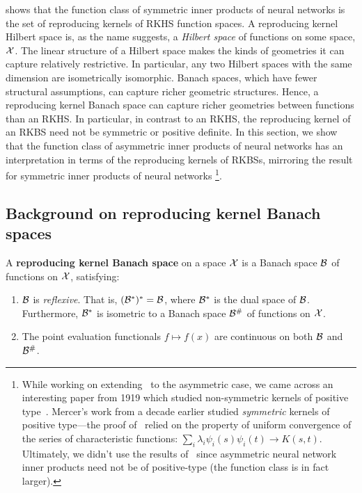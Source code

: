  shows that the function class of symmetric inner products of neural networks is the set of reproducing kernels of RKHS function spaces. A reproducing kernel Hilbert space is, as the name suggests, a \textit{Hilbert space} of functions on some space, ${\mathcal{X}}$. The linear structure of a Hilbert space makes the kinds of geometries it can capture relatively restrictive. In particular, any two Hilbert spaces with the same dimension are isometrically isomorphic. Banach spaces, which have fewer structural assumptions, can capture richer geometric structures. Hence, a reproducing kernel Banach space can capture richer geometries between functions than an RKHS. In particular, in contrast to an RKHS, the reproducing kernel of an RKBS need not be symmetric or positive definite. In this section, we show that the function class of asymmetric inner products of neural networks has an interpretation in terms of the reproducing kernels of RKBSs, mirroring the result for symmetric inner products of neural networks
\footnote{While working on extending~ to the asymmetric case, we came across an interesting paper from 1919 which studied non-symmetric kernels of positive type~\parencite{seelyNonSymmetricKernels1919}. Mercer's work from a decade earlier studied \textit{symmetric} kernels of positive type---the proof of~ relied on the property of uniform convergence of the series of characteristic functions: $\sum_i \lambda_i \psi_i(s)\psi_i(t) \to K(s,t)$. Ultimately, we didn't use the results of~\parencite{seelyNonSymmetricKernels1919} since asymmetric neural network inner products need not be of positive-type (the function class is in fact larger).}.

\subsection{Background on reproducing kernel Banach spaces}

\begin{definition}
    A \textbf{reproducing kernel Banach space} on a space ${\mathcal{X}}$ is a Banach space ${\mathcal{B}}$ of functions on ${\mathcal{X}}$, satisfying:
    \begin{enumerate}
        \item ${\mathcal{B}}$ is \textit{reflexive}. That is, $({\mathcal{B}}^*)^* = {\mathcal{B}}$, where ${\mathcal{B}}^*$ is the dual space of ${\mathcal{B}}$. Furthermore, ${\mathcal{B}}^*$ is isometric to a Banach space ${\mathcal{B}}^\#$ of functions on ${\mathcal{X}}$.
        \item The point evaluation functionals $f \mapsto f(x)$ are continuous on both ${\mathcal{B}}$ and ${\mathcal{B}}^\#$.
    \end{enumerate}
\end{definition}

